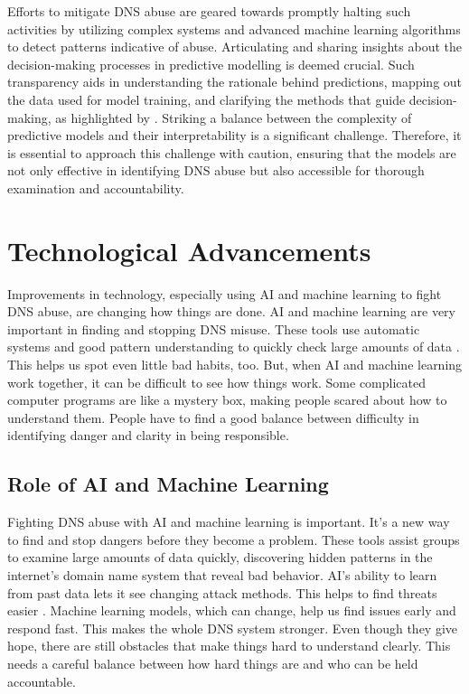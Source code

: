 Efforts to mitigate DNS abuse are geared towards promptly halting such activities by utilizing complex systems and advanced machine learning algorithms to detect patterns indicative of abuse. Articulating and sharing insights about the decision-making processes in predictive modelling is deemed crucial. Such transparency aids in understanding the rationale behind predictions, mapping out the data used for model training, and clarifying the methods that guide decision-making, as highlighted by \cite{hussain2022software}. Striking a balance between the complexity of predictive models and their interpretability is a significant challenge. Therefore, it is essential to approach this challenge with caution, ensuring that the models are not only effective in identifying DNS abuse but also accessible for thorough examination and accountability.

\section{Technological Advancements}

Improvements in technology, especially using AI and machine learning to fight DNS abuse, are changing how things are done. AI and machine learning are very important in finding and stopping DNS misuse. These tools use automatic systems and good pattern understanding to quickly check large amounts of data \cite{goethals2021enabling}. This helps us spot even little bad habits, too. But, when AI and machine learning work together, it can be difficult to see how things work. Some complicated computer programs are like a mystery box, making people scared about how to understand them. People have to find a good balance between difficulty in identifying danger and clarity in being responsible.

\subsection{Role of AI and Machine Learning}

Fighting DNS abuse with AI and machine learning is important. It's a new way to find and stop dangers before they become a problem. These tools assist groups to examine large amounts of data quickly, discovering hidden patterns in the internet's domain name system that reveal bad behavior. AI's ability to learn from past data lets it see changing attack methods. This helps to find threats easier \cite{tariq2023critical}. Machine learning models, which can change, help us find issues early and respond fast. This makes the whole DNS system stronger. Even though they give hope, there are still obstacles that make things hard to understand clearly. This needs a careful balance between how hard things are and who can be held accountable.

